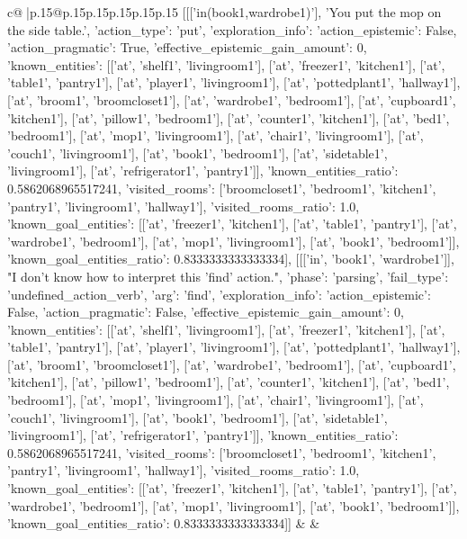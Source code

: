 \documentclass{article}
\begin{document}
{\begin{supertabular}{c@{$\;$}|p{.15\linewidth}@{}p{.15\linewidth}p{.15\linewidth}p{.15\linewidth}p{.15\linewidth}p{.15\linewidth}}
{{{	 [[['in(book1,wardrobe1)'], 'You put the mop on the side table.', {'action_type': 'put', 'exploration_info': {'action_epistemic': False, 'action_pragmatic': True, 'effective_epistemic_gain_amount': 0, 'known_entities': [['at', 'shelf1', 'livingroom1'], ['at', 'freezer1', 'kitchen1'], ['at', 'table1', 'pantry1'], ['at', 'player1', 'livingroom1'], ['at', 'pottedplant1', 'hallway1'], ['at', 'broom1', 'broomcloset1'], ['at', 'wardrobe1', 'bedroom1'], ['at', 'cupboard1', 'kitchen1'], ['at', 'pillow1', 'bedroom1'], ['at', 'counter1', 'kitchen1'], ['at', 'bed1', 'bedroom1'], ['at', 'mop1', 'livingroom1'], ['at', 'chair1', 'livingroom1'], ['at', 'couch1', 'livingroom1'], ['at', 'book1', 'bedroom1'], ['at', 'sidetable1', 'livingroom1'], ['at', 'refrigerator1', 'pantry1']], 'known_entities_ratio': 0.5862068965517241, 'visited_rooms': ['broomcloset1', 'bedroom1', 'kitchen1', 'pantry1', 'livingroom1', 'hallway1'], 'visited_rooms_ratio': 1.0, 'known_goal_entities': [['at', 'freezer1', 'kitchen1'], ['at', 'table1', 'pantry1'], ['at', 'wardrobe1', 'bedroom1'], ['at', 'mop1', 'livingroom1'], ['at', 'book1', 'bedroom1']], 'known_goal_entities_ratio': 0.8333333333333334}}], [[['in', 'book1', 'wardrobe1']], "I don't know how to interpret this 'find' action.", {'phase': 'parsing', 'fail_type': 'undefined_action_verb', 'arg': 'find', 'exploration_info': {'action_epistemic': False, 'action_pragmatic': False, 'effective_epistemic_gain_amount': 0, 'known_entities': [['at', 'shelf1', 'livingroom1'], ['at', 'freezer1', 'kitchen1'], ['at', 'table1', 'pantry1'], ['at', 'player1', 'livingroom1'], ['at', 'pottedplant1', 'hallway1'], ['at', 'broom1', 'broomcloset1'], ['at', 'wardrobe1', 'bedroom1'], ['at', 'cupboard1', 'kitchen1'], ['at', 'pillow1', 'bedroom1'], ['at', 'counter1', 'kitchen1'], ['at', 'bed1', 'bedroom1'], ['at', 'mop1', 'livingroom1'], ['at', 'chair1', 'livingroom1'], ['at', 'couch1', 'livingroom1'], ['at', 'book1', 'bedroom1'], ['at', 'sidetable1', 'livingroom1'], ['at', 'refrigerator1', 'pantry1']], 'known_entities_ratio': 0.5862068965517241, 'visited_rooms': ['broomcloset1', 'bedroom1', 'kitchen1', 'pantry1', 'livingroom1', 'hallway1'], 'visited_rooms_ratio': 1.0, 'known_goal_entities': [['at', 'freezer1', 'kitchen1'], ['at', 'table1', 'pantry1'], ['at', 'wardrobe1', 'bedroom1'], ['at', 'mop1', 'livingroom1'], ['at', 'book1', 'bedroom1']], 'known_goal_entities_ratio': 0.8333333333333334}}]] 
	  } 
	   } 
	   } 
	 & & \\ 
 

    \theutterance {}  


\end{supertabular}}
\end{document}
